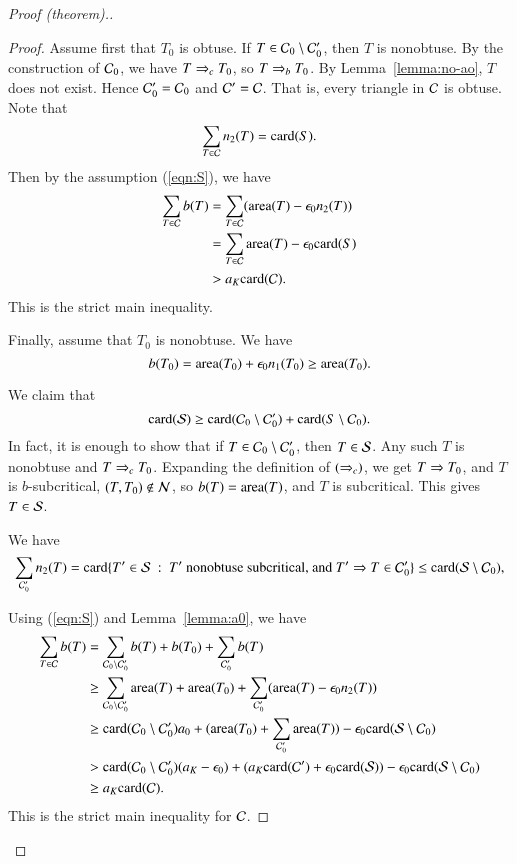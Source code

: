 \begin{proof}[Proof (theorem).]
\begin{proof}
  Assume first that $T_0$ is obtuse.  If $T\in \C_0\setminus \C_0'$,
  then $T$ is nonobtuse.  By the construction of $\C_0$, we have
  $T\ra{c} T_0$, so $T\ra{b} T_0$.  By Lemma~\ref{lemma:no-ao}, $T$
  does not exist.  Hence $\C_0' = \C_0$ and $\C'=\C$.  That is, every
  triangle in $\C$ is obtuse.  Note that
\[
\sum_{T\in \C} n_2(T) = \card(S).
\]
Then by the assumption (\ref{eqn:S}), we have
\begin{align*}
\sum_{T\in \C} b(T) &=\sum_{T\in \C} (\area(T) - \epso n_2(T)) \\
&= \sum_{T\in \C} \area(T) - \epso \card(S) \\
&> a_K \card(\C).
\end{align*}
This is the strict main inequality.

Finally, assume that $T_0$ is nonobtuse.  We have
\[
b(T_0) = \area(T_0) + \epso n_1(T_0) \ge \area(T_0).
\]

We claim that 
\[
\card(\S) \ge \card(\C_0 \setminus \C_0') + \card(S\setminus \C_0).
\]
In fact, it is enough to show that if $T\in \C_0\setminus \C_0'$, then
$T\in \S$.  Any such $T$ is nonobtuse and $T\ra{c}T_0$.  Expanding
the definition of $(\ra{c})$, we get $T\rat T_0$, and $T$ is
$b$-subcritical, $(T,T_0)\not\in\N$, so $b(T) = \area(T)$, and $T$ is
subcritical.   This gives $T\in \S$.

We have
\[
\sum_{\C_0'} n_2(T) = \card\{T'\in\S \mid T' \text{ nonobtuse
  subcritical, and } T'\rat T\in \C_0' \} \le \card(\S\setminus \C_0 ),
\]

Using (\ref{eqn:S}) and Lemma~\ref{lemma:a0}, we have
\begin{align*}
\sum_{T\in \C} b(T) &= \sum_{\C_0\setminus \C_0'} b(T) + b(T_0) +
\sum_{\C_0'} b(T) \\
&\ge \sum_{\C_0\setminus \C_0'} \area(T) + \area(T_0) +
\sum_{\C_0'} (\area(T) - \epso n_2(T)) \\
&\ge \card({\C_0\setminus \C_0'}) a_0 + (\area(T_0) +
\sum_{\C_0'} \area(T)) - \epso \card(\S\setminus \C_0)\\
&> \card({\C_0\setminus \C_0'}) (\aK  - \epso) + (\aK \card(\C') +
\epso \card(\S)) - \epso \card(\S\setminus \C_0)\\
&\ge a_K \card(\C).
\end{align*}
This is the strict main inequality for $\C$.
\end{proof}


\end{proof}
